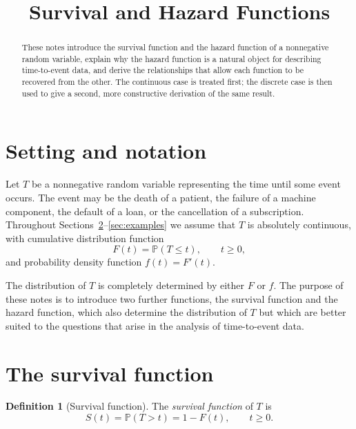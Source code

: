 \documentclass[11pt]{article}
\title{Survival and Hazard Functions}
\author{}
\date{}
\theoremstyle{definition}
\newtheorem{definition}{Definition}[section]
\theoremstyle{plain}
\newcommand{\Prob}{\mathbb{P}}
\begin{document}
\maketitle

\begin{abstract}
These notes introduce the survival function and the hazard function of a nonnegative random variable, explain why the hazard function is a natural object for describing time-to-event data, and derive the relationships that allow each function to be recovered from the other. The continuous case is treated first; the discrete case is then used to give a second, more constructive derivation of the same result.
\end{abstract}

\tableofcontents

\section{Setting and notation}

Let $T$ be a nonnegative random variable representing the time until some event occurs. The event may be the death of a patient, the failure of a machine component, the default of a loan, or the cancellation of a subscription. Throughout Sections~\ref{sec:survival}--\ref{sec:examples} we assume that $T$ is absolutely continuous, with cumulative distribution function
\[
  F(t) = \Prob(T \le t), \qquad t \ge 0,
\]
and probability density function $f(t) = F'(t)$.

The distribution of $T$ is completely determined by either $F$ or $f$. The purpose of these notes is to introduce two further functions, the survival function and the hazard function, which also determine the distribution of $T$ but which are better suited to the questions that arise in the analysis of time-to-event data.

\section{The survival function}\label{sec:survival}

\begin{definition}[Survival function]
The \emph{survival function} of $T$ is
\[
  S(t) = \Prob(T > t) = 1 - F(t), \qquad t \ge 0.
\]
\end{definition}
\end{document}
